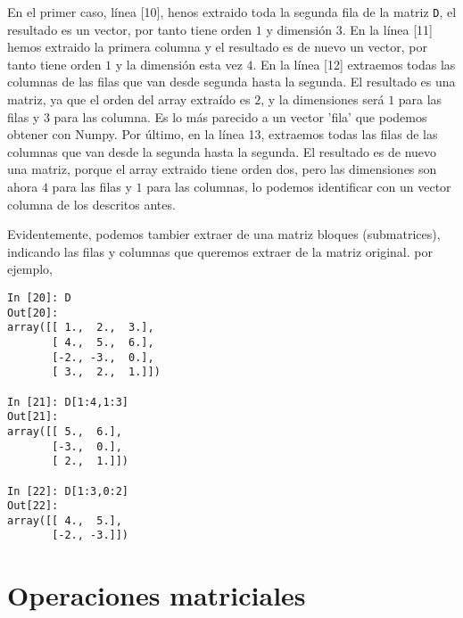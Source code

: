 \begin{paracol}{2}
En el primer caso, línea [10], henos extraido toda la segunda fila de la matriz \texttt{D}, el resultado es un vector, por tanto tiene orden $1$ y dimensión $3$. En la línea [11] hemos extraido la primera columna y el resultado es de nuevo un vector, por tanto tiene orden $1$ y la dimensión esta vez $4$. En la línea [12] extraemos todas las columnas de las filas que van desde  segunda hasta la segunda. El resultado es una matriz, ya que el orden del array extraído es $2$, y la dimensiones será $1$ para las filas y $3$ para las columna. Es lo más parecido a un vector 'fila' que podemos obtener con Numpy. Por último, en la línea 13, extraemos todas las filas de las columnas que van desde la segunda hasta la segunda. El resultado es de nuevo una matriz, porque el array extraido tiene orden dos, pero las dimensiones son ahora $4$ para las filas y $1$ para las columnas, lo podemos identificar con un vector columna de los descritos antes.

Evidentemente, podemos tambier extraer de una matriz bloques (submatrices), indicando las filas y columnas que queremos extraer de la matriz original. por ejemplo,
\end{paracol}

\begin{center}
 \begin{minipage}{0.3\textwidth}
    \begin{verbatim}
In [20]: D
Out[20]: 
array([[ 1.,  2.,  3.],
       [ 4.,  5.,  6.],
       [-2., -3.,  0.],
       [ 3.,  2.,  1.]])

In [21]: D[1:4,1:3]
Out[21]: 
array([[ 5.,  6.],
       [-3.,  0.],
       [ 2.,  1.]])

In [22]: D[1:3,0:2]
Out[22]: 
array([[ 4.,  5.],
       [-2., -3.]])
    \end{verbatim}
 \end{minipage}
\end{center}

\begin{paracol}{2}

\end{paracol}
\section{Operaciones matriciales}\label{opmatr}
  
